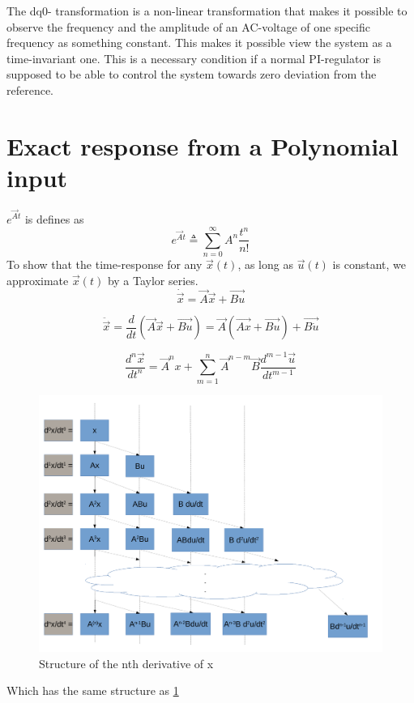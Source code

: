 The dq0- transformation is a non-linear transformation that makes it possible to observe the frequency and the amplitude of an AC-voltage of one specific frequency as something constant. This makes it possible view the system as a time-invariant one. This is a necessary condition if a normal PI-regulator is supposed to be able to control the system towards zero deviation from the reference. 


    
\section{Exact response from a Polynomial input }    
\label{sec:finding_response_from_polynomial_inputs}
$e^{\Vec{A}t}$ is defines as 
\begin{equation}
    e^{\Vec{A}t} \triangleq  \sum_{n=0}^\infty A^n \frac{t^n}{n!}
\end{equation}{}
To show that the time-response for any $\Vec{x}(t)$, as long as $\Vec{u}(t)$ is constant, we approximate $\Vec{x}(t)$ by a Taylor series. 
\begin{equation}
    \dot{\Vec{x}} = \Vec{A}\Vec{x} + \Vec{Bu}
\end{equation}{}
    
\begin{equation}
    \ddot{\Vec{x}} = \frac{d}{dt} \left( \Vec{A}\Vec{x} + \Vec{Bu} \right) = \Vec{A}( \Vec{Ax}+ \Vec{Bu}) + \Vec{B \dot{u} }
\end{equation}{}

\begin{equation}
    \frac{d^n\Vec{x}}{dt^n} = \Vec{A}^nx + \sum_{m=1}^n \Vec{A}^{n-m}\Vec{B}\frac{d^{m-1}\Vec{u}}{dt^{m-1}}
\end{equation}{}

\begin{figure}
    \centering
    \includegraphics[width=\textwidth,height=\textheight,keepaspectratio]{Figures/Derivasjons_figur.pdf}
    \caption{Structure of the nth derivative of x}
    \label{fig:derivative_figure}
\end{figure}
Which has the same structure as \cref{fig:derivative_figure}

